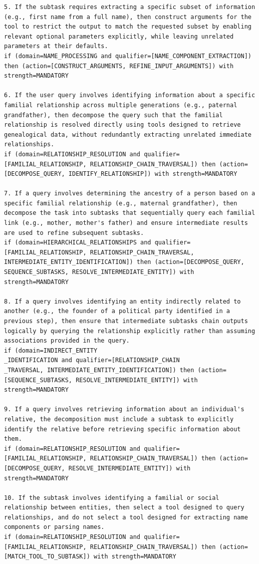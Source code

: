 \documentclass[11pt]{article}
\begin{document}
\begin{lstlisting}[style=rulestyle, caption={Sample rules learned from the ToolHop dataset}]
5. If the subtask requires extracting a specific subset of information (e.g., first name from a full name), then construct arguments for the tool to restrict the output to match the requested subset by enabling relevant optional parameters explicitly, while leaving unrelated parameters at their defaults.
if (domain=NAME_PROCESSING and qualifier=[NAME_COMPONENT_EXTRACTION]) then (action=[CONSTRUCT_ARGUMENTS, REFINE_INPUT_ARGUMENTS]) with strength=MANDATORY

6. If the user query involves identifying information about a specific familial relationship across multiple generations (e.g., paternal grandfather), then decompose the query such that the familial relationship is resolved directly using tools designed to retrieve genealogical data, without redundantly extracting unrelated immediate relationships.
if (domain=RELATIONSHIP_RESOLUTION and qualifier=[FAMILIAL_RELATIONSHIP, RELATIONSHIP_CHAIN_TRAVERSAL]) then (action=[DECOMPOSE_QUERY, IDENTIFY_RELATIONSHIP]) with strength=MANDATORY

7. If a query involves determining the ancestry of a person based on a specific familial relationship (e.g., maternal grandfather), then decompose the task into subtasks that sequentially query each familial link (e.g., mother, mother's father) and ensure intermediate results are used to refine subsequent subtasks.
if (domain=HIERARCHICAL_RELATIONSHIPS and qualifier=[FAMILIAL_RELATIONSHIP, RELATIONSHIP_CHAIN_TRAVERSAL, INTERMEDIATE_ENTITY_IDENTIFICATION]) then (action=[DECOMPOSE_QUERY, SEQUENCE_SUBTASKS, RESOLVE_INTERMEDIATE_ENTITY]) with strength=MANDATORY

8. If a query involves identifying an entity indirectly related to another (e.g., the founder of a political party identified in a previous step), then ensure that intermediate subtasks chain outputs logically by querying the relationship explicitly rather than assuming associations provided in the query.
if (domain=INDIRECT_ENTITY
_IDENTIFICATION and qualifier=[RELATIONSHIP_CHAIN
_TRAVERSAL, INTERMEDIATE_ENTITY_IDENTIFICATION]) then (action=[SEQUENCE_SUBTASKS, RESOLVE_INTERMEDIATE_ENTITY]) with strength=MANDATORY

9. If a query involves retrieving information about an individual's relative, the decomposition must include a subtask to explicitly identify the relative before retrieving specific information about them.
if (domain=RELATIONSHIP_RESOLUTION and qualifier=[FAMILIAL_RELATIONSHIP, RELATIONSHIP_CHAIN_TRAVERSAL]) then (action=[DECOMPOSE_QUERY, RESOLVE_INTERMEDIATE_ENTITY]) with strength=MANDATORY

10. If the subtask involves identifying a familial or social relationship between entities, then select a tool designed to query relationships, and do not select a tool designed for extracting name components or parsing names.
if (domain=RELATIONSHIP_RESOLUTION and qualifier=[FAMILIAL_RELATIONSHIP, RELATIONSHIP_CHAIN_TRAVERSAL]) then (action=[MATCH_TOOL_TO_SUBTASK]) with strength=MANDATORY


\end{lstlisting}
\end{document}
